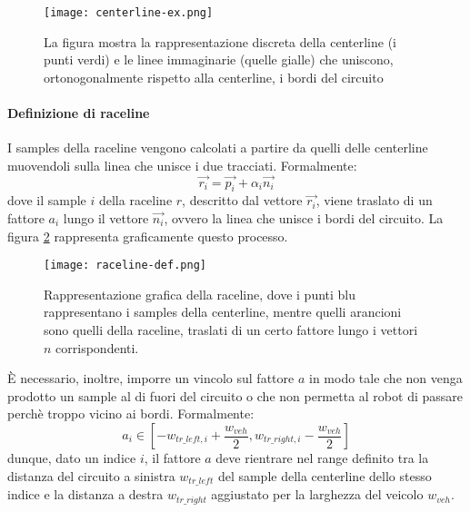 \begin{figure}[h]
	\begin{center}
		\texttt{[image: centerline-ex.png]}
	\end{center}
	\caption{La figura mostra la rappresentazione discreta della centerline (i punti verdi) e le linee
		immaginarie (quelle gialle) che uniscono, ortonogonalmente rispetto alla centerline, i bordi
		del circuito}
		\label{fig:centerline-ex}
\end{figure}

\paragraph{Definizione di raceline}
\label{par:raceline}
I samples della raceline vengono calcolati a partire da quelli delle centerline muovendoli sulla linea
che unisce i due tracciati. Formalmente:
\[
	\overrightarrow{r_i} = \overrightarrow{p_i} + \alpha_i \overrightarrow{n_i}
\]
dove il sample $i$ della raceline $r$, descritto dal vettore $\overrightarrow{r_i}$, viene traslato di un
fattore $a_i$ lungo il vettore $\overrightarrow{n_i}$, ovvero la linea che unisce i bordi del circuito.
La figura \ref{fig:raceline-def} rappresenta graficamente questo processo.

\begin{figure}[h]
	\begin{center}
		\texttt{[image: raceline-def.png]}
	\end{center}
	\caption{Rappresentazione grafica della raceline, dove i punti blu rappresentano i samples della
		centerline, mentre quelli arancioni sono quelli della raceline, traslati di un certo fattore lungo i
		vettori $n$ corrispondenti. \cite{lection22}}
	\label{fig:raceline-def}
\end{figure}

È necessario, inoltre, imporre un vincolo sul fattore $a$ in modo tale che non venga prodotto un sample
al di fuori del circuito o che non permetta al robot di passare perchè troppo vicino ai bordi.
Formalmente:
\begin{equation}
	a_i \in [ -w_{tr\_left, i} + \frac{w_{veh}}{2}, w_{tr\_right, i} - \frac{w_{veh}}{2}]
	\label{eq:a_constr}
\end{equation}
dunque, dato un indice $i$, il fattore $a$ deve rientrare nel range definito tra la distanza del circuito
a sinistra $w_{tr\_left}$ del sample della centerline dello stesso indice e la distanza a destra
$w_{tr\_right}$ aggiustato per la larghezza del veicolo $w_{veh}$.

